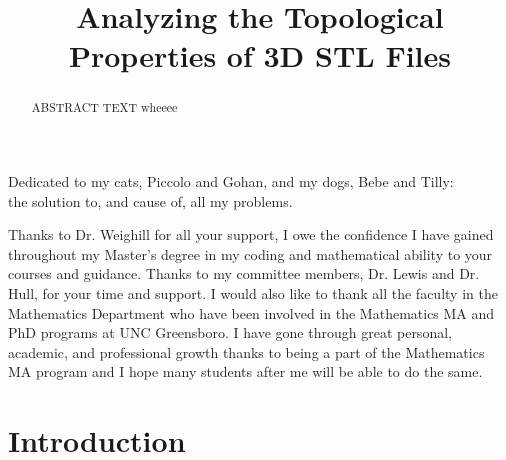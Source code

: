 \documentclass[ma]{uncgdissertationexp}
\title{Analyzing the Topological Properties of 3D STL Files}
\theoremstyle{plain}
\theoremstyle{definition}
\theoremstyle{remark}
\begin{document}
\frontmatter      %
\begin{abstract}
ABSTRACT TEXT wheeee
\end{abstract}
\maketitlepage  
\makecopyrightpage
\begin{dedication}
Dedicated to my cats, Piccolo and Gohan, and my dogs, Bebe and Tilly:\\
the solution to, and cause of, all my problems.
\end{dedication}
\makeapprovalpage
\begin{acknowledgments}
\par Thanks to Dr. Weighill for all your support, I owe the confidence I have gained throughout my Master's degree in my coding and mathematical ability to your courses and guidance. Thanks to my committee members, Dr. Lewis and Dr. Hull, for your time and support. I would also like to thank all the faculty in the Mathematics Department who have been involved in the Mathematics MA and PhD programs at UNC Greensboro. I have gone through great personal, academic, and professional growth thanks to being a part of the Mathematics MA program and I hope many students after me will be able to do the same.
\end{acknowledgments}
\tableofcontents
\listoffigures
\mainmatter

\chapter{Introduction}
\end{document}
